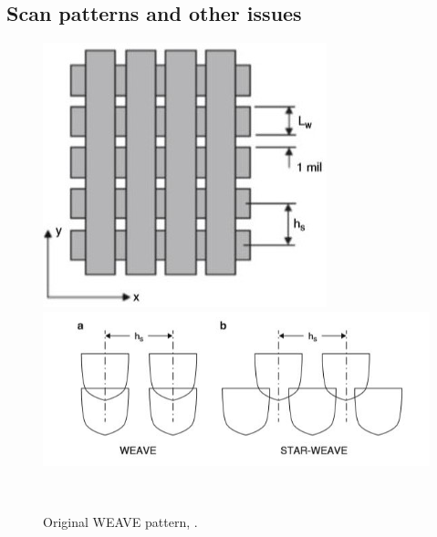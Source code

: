 \documentclass[a4paper, 11pt, reqno]{report}
\begin{document}
\subsection{Scan patterns and other issues}
%
\begin{figure}[b!]
  \centering
  \begin{minipage}[b]{0.45\textwidth}
    \includegraphics[width=\textwidth]{weave1}
  \end{minipage}
  \hfill
  \begin{minipage}[b]{0.45\textwidth}
    \includegraphics[width=\textwidth]{weave2}
  \end{minipage}
  \\[1pt]
  \begin{minipage}[t]{0.45\textwidth}
    \caption{Original WEAVE pattern, \cite[p. 87]{AMT}.}
  \end{minipage}
  \hfill
  \begin{minipage}[t]{0.45\textwidth}

\end{minipage}
\end{figure}
\end{document}
